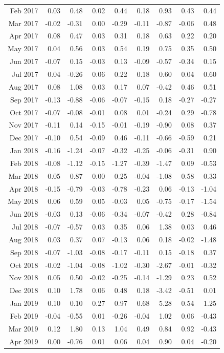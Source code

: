 \begin{tabularx}{\textwidth}{rrrrrrrrr}
  Feb 2017 & 0.03 & 0.48 & 0.02 & 0.44 & 0.18 & 0.93 & 0.43 & 0.44 \\ 
  Mar 2017 & -0.02 & -0.31 & 0.00 & -0.29 & -0.11 & -0.87 & -0.06 & 0.48 \\ 
  Apr 2017 & 0.08 & 0.47 & 0.03 & 0.31 & 0.18 & 0.63 & 0.22 & 0.20 \\ 
  May 2017 & 0.04 & 0.56 & 0.03 & 0.54 & 0.19 & 0.75 & 0.35 & 0.50 \\ 
  Jun 2017 & -0.07 & 0.15 & -0.03 & 0.13 & -0.09 & -0.57 & -0.34 & 0.15 \\ 
  Jul 2017 & 0.04 & -0.26 & 0.06 & 0.22 & 0.18 & 0.60 & 0.04 & 0.60 \\ 
  Aug 2017 & 0.08 & 1.08 & 0.03 & 0.17 & 0.07 & -0.42 & 0.46 & 0.51 \\ 
  Sep 2017 & -0.13 & -0.88 & -0.06 & -0.07 & -0.15 & 0.18 & -0.27 & -0.27 \\ 
  Oct 2017 & -0.07 & -0.08 & -0.01 & 0.08 & 0.01 & -0.24 & 0.29 & -0.78 \\ 
  Nov 2017 & -0.11 & 0.14 & -0.15 & -0.01 & -0.19 & -0.90 & 0.08 & 0.37 \\ 
  Dec 2017 & -0.10 & 0.54 & -0.09 & 0.46 & -0.11 & -0.66 & -0.59 & 0.21 \\ 
  Jan 2018 & -0.16 & -1.24 & -0.07 & -0.32 & -0.25 & -0.06 & -0.31 & 0.90 \\ 
  Feb 2018 & -0.08 & -1.12 & -0.15 & -1.27 & -0.39 & -1.47 & 0.09 & -0.53 \\ 
  Mar 2018 & 0.05 & 0.87 & 0.00 & 0.25 & -0.04 & -1.08 & 0.58 & 0.33 \\ 
  Apr 2018 & -0.15 & -0.79 & -0.03 & -0.78 & -0.23 & 0.06 & -0.13 & -1.04 \\ 
  May 2018 & 0.06 & 0.59 & 0.05 & -0.03 & 0.05 & -0.75 & -0.17 & -1.54 \\ 
  Jun 2018 & -0.03 & 0.13 & -0.06 & -0.34 & -0.07 & -0.42 & 0.28 & -0.84 \\ 
  Jul 2018 & -0.07 & -0.57 & 0.03 & 0.35 & 0.06 & 1.38 & 0.03 & 0.46 \\ 
  Aug 2018 & 0.03 & 0.37 & 0.07 & -0.13 & 0.06 & 0.18 & -0.02 & -1.48 \\ 
  Sep 2018 & -0.07 & -1.03 & -0.08 & -0.17 & -0.11 & 0.15 & -0.18 & 0.37 \\ 
  Oct 2018 & -0.02 & -1.04 & -0.08 & -1.02 & -0.30 & -2.67 & -0.01 & -0.32 \\ 
  Nov 2018 & 0.05 & 0.50 & -0.02 & -0.25 & -0.14 & -1.29 & 0.23 & 0.52 \\ 
  Dec 2018 & 0.10 & 1.78 & 0.06 & 0.48 & 0.18 & -3.42 & -0.51 & 0.01 \\ 
  Jan 2019 & 0.10 & 0.10 & 0.27 & 0.97 & 0.68 & 5.28 & 0.54 & 1.25 \\ 
  Feb 2019 & -0.04 & -0.55 & 0.01 & -0.26 & -0.04 & 1.02 & 0.06 & -0.43 \\ 
  Mar 2019 & 0.12 & 1.80 & 0.13 & 1.04 & 0.49 & 0.84 & 0.92 & -0.43 \\ 
  Apr 2019 & 0.00 & -0.76 & 0.01 & 0.06 & 0.04 & 0.90 & 0.04 & -0.20 \\ 
   \hline
\end{tabularx}
